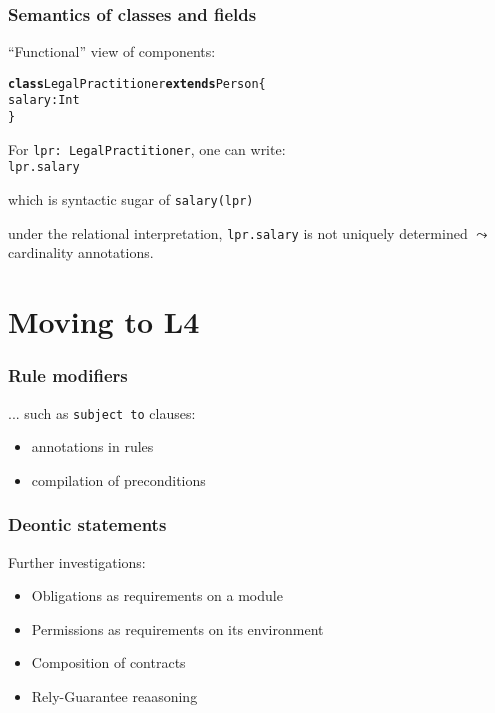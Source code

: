 \documentclass{beamer}
\begin{document}
\begin{frame}[fragile]\frametitle{Semantics of classes and fields}



  ``Functional'' view of components:
\begin{alltt}
\textbf{class} LegalPractitioner \textbf{extends} Person \{
      salary: Int
\}
\end{alltt}

For \texttt{lpr: LegalPractitioner}, one can write:\\
\texttt{lpr.salary}

which is syntactic sugar of \texttt{salary(lpr)}

 under the relational interpretation, \texttt{lpr.salary} is
not uniquely determined $\leadsto$ cardinality annotations.

\end{frame}
  
\section{Moving to L4}


\begin{frame}[fragile]\frametitle{Rule modifiers}

  ... such as \texttt{subject to} clauses:

  \begin{itemize}
  \item annotations in rules 
  \item compilation of preconditions
  \end{itemize}


\end{frame}


\begin{frame}[fragile]\frametitle{Deontic statements}

  Further investigations:

  \begin{itemize}
  \item Obligations as requirements on a module
  \item Permissions as requirements on its environment
  \item Composition of contracts
  \item Rely-Guarantee reaasoning
  \end{itemize}

\end{frame}



\end{document}
